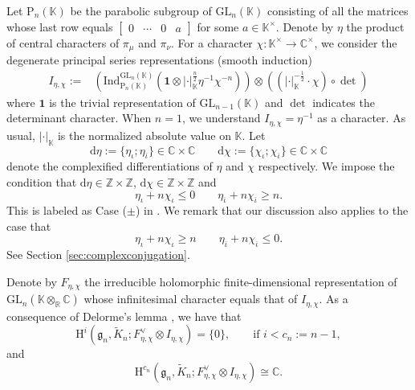 \documentclass[12pt, a4paper]{amsart}
\newcommand{\RH}{{\mathrm {H}}}
\newcommand{\RP}{{\mathrm {P}}}
\newcommand{\GL}{{\mathrm{GL}}}
\newcommand{\Z}{\mathbb{Z}}
\newcommand{\C}{\mathbb{C}}
\newcommand{\R}{\mathbb R}
\newcommand{\K}{\mathbb{K}}
\theoremstyle{Theorem}
\theoremstyle{Theorem}
\theoremstyle{Theorem}
\theoremstyle{Theorem}
\theoremstyle{Plain}
\theoremstyle{Definition}
\begin{document}
	Let $\RP_n(\K)$ be the parabolic subgroup of $\GL_n(\K)$ consisting of all the matrices whose last row equals $\begin{bmatrix}
		0 & \cdots & 0 & a
	\end{bmatrix}$ for some $a\in\K^{\times}$. Denote by $\eta$ the product of central characters of $\pi_{\mu}$ and $\pi_{\nu}$. For a character $\chi:\K^{\times}\to\C^{\times}$, we consider the degenerate principal series representations (smooth induction)
	\begin{equation}
		\begin{aligned}
			I_{\eta,\chi}:=&\left(\mathrm{Ind}^{\GL_n(\K)}_{\RP_n(\K)}\left(\mathbf{1}\otimes|\cdot|_{\K}^{\frac{n}{2}}\eta^{-1}\chi^{-n}\right)\right)\otimes\left((|\cdot|_{\K}^{-\frac{1}{2}}\cdot\chi)\circ\det\right)
		\end{aligned}
	\end{equation}
	where $\mathbf{1}$ is the trivial representation of $\GL_{n-1}(\K)$ and $\det$ indicates the determinant character. When $n=1$, we understand $I_{\eta,\chi}=\eta^{-1}$ as a character. %
	As usual, $|\cdot|_{\K}$ is the normalized absolute value on $\K$. Let
	\begin{equation}
		\mathrm{d}\eta:=\{\eta_{\iota};\eta_{\overline{\iota}}\}\in\C\times\C\qquad\mathrm{d}\chi:=\{\chi_{\iota};\chi_{\overline{\iota}}\}\in\C\times\C
	\end{equation}
	denote the complexified differentiations of $\eta$ and $\chi$ respectively. We impose the condition that $\mathrm{d}\eta\in\Z\times\Z$, $\mathrm{d}\chi\in\Z\times\Z$ and
	\begin{equation}
		\label{CM}
		\eta_{\iota}+n\chi_{\iota}\leq 0\qquad \eta_{\overline{\iota}}+n\chi_{\overline{\iota}}\geq n.
	\end{equation}
	This is labeled as Case ($\pm$) in \cite{JLSa}. We remark that our discussion also applies to the case that
	\begin{equation}\label{CM'}
		\eta_{\iota}+n\chi_{\iota}\geq n\qquad \eta_{\overline{\iota}}+n\chi_{\overline{\iota}}\leq 0.
	\end{equation}
	See Section \ref{sec:complexconjugation}.
	
	Denote by $F_{\eta,\chi}$ the irreducible holomorphic finite-dimensional representation of $\GL_n(\K\otimes_{\R}\C)$ whose infinitesimal character equals that of $I_{\eta,\chi}$.  As a consequence of Delorme's lemma \cite[Theorem III.3.3]{BW}, we have that
	\[
	\RH^i\left(\mathfrak{g}_n,\widetilde{K}_n;F_{\eta,\chi}^{\vee}\otimes I_{\eta,\chi}\right)=\{0\},\qquad\text{if }i<c_n:=n-1,
	\]
	and
	\[
	\RH^{c_n}\left(\mathfrak{g}_n,\widetilde{K}_n;F_{\eta,\chi}^{\vee}\otimes I_{\eta,\chi}\right)\cong\C.
	\]
	
\end{document}
